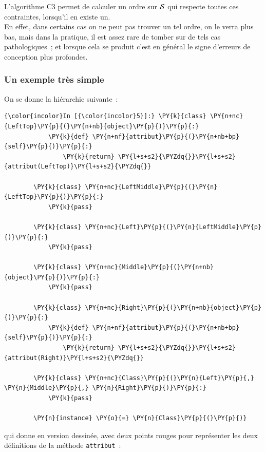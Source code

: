     L'algorithme C3 permet de calculer un ordre sur \(\cal{S}\) qui respecte
toutes ces contraintes, lorsqu'il en existe un.\\

En effet, dans certains cas on ne peut pas trouver un tel ordre, on le
verra plus bas, mais dans la pratique, il est assez rare de tomber sur
de tels cas pathologiques~; et lorsque cela se produit c'est en général
le signe d'erreurs de conception plus profondes.

    \hypertarget{un-exemple-truxe8s-simple}{%
\subsubsection{Un exemple très simple}\label{un-exemple-truxe8s-simple}}

    On se donne la hiérarchie suivante~:

    \begin{Verbatim}[commandchars=\\\{\}]
{\color{incolor}In [{\color{incolor}5}]:} \PY{k}{class} \PY{n+nc}{LeftTop}\PY{p}{(}\PY{n+nb}{object}\PY{p}{)}\PY{p}{:}
            \PY{k}{def} \PY{n+nf}{attribut}\PY{p}{(}\PY{n+nb+bp}{self}\PY{p}{)}\PY{p}{:} 
                \PY{k}{return} \PY{l+s+s2}{\PYZdq{}}\PY{l+s+s2}{attribut(LeftTop)}\PY{l+s+s2}{\PYZdq{}}
            
        \PY{k}{class} \PY{n+nc}{LeftMiddle}\PY{p}{(}\PY{n}{LeftTop}\PY{p}{)}\PY{p}{:} 
            \PY{k}{pass}
        
        \PY{k}{class} \PY{n+nc}{Left}\PY{p}{(}\PY{n}{LeftMiddle}\PY{p}{)}\PY{p}{:} 
            \PY{k}{pass}
        
        \PY{k}{class} \PY{n+nc}{Middle}\PY{p}{(}\PY{n+nb}{object}\PY{p}{)}\PY{p}{:} 
            \PY{k}{pass}
        
        \PY{k}{class} \PY{n+nc}{Right}\PY{p}{(}\PY{n+nb}{object}\PY{p}{)}\PY{p}{:}
            \PY{k}{def} \PY{n+nf}{attribut}\PY{p}{(}\PY{n+nb+bp}{self}\PY{p}{)}\PY{p}{:} 
                \PY{k}{return} \PY{l+s+s2}{\PYZdq{}}\PY{l+s+s2}{attribut(Right)}\PY{l+s+s2}{\PYZdq{}}
        
        \PY{k}{class} \PY{n+nc}{Class}\PY{p}{(}\PY{n}{Left}\PY{p}{,} \PY{n}{Middle}\PY{p}{,} \PY{n}{Right}\PY{p}{)}\PY{p}{:} 
            \PY{k}{pass}
        
        \PY{n}{instance} \PY{o}{=} \PY{n}{Class}\PY{p}{(}\PY{p}{)}
\end{Verbatim}


    qui donne en version dessinée, avec deux points rouges pour représenter
les deux définitions de la méthode \texttt{attribut}~:

